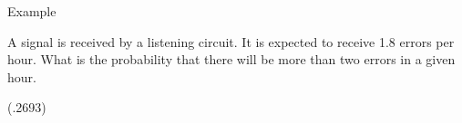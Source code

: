 \begin{frame}{Example}

  \vfill

    A signal is received by a listening circuit. It is expected to
    receive 1.8 errors per hour. What is the probability that there
    will be more than two errors in a given hour.

  \vfill

  (.2693)
  
\end{frame}



